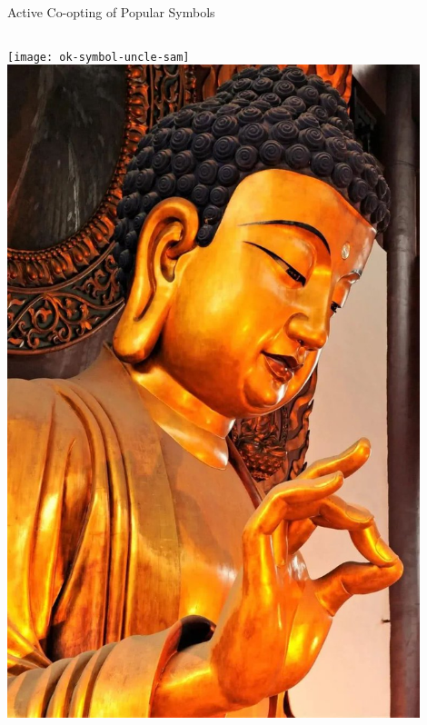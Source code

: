 \documentclass[nobackground,dvipsnames,table]{beamer}
\begin{document}
\begin{frame}{Active Co-opting of Popular Symbols}
    \begin{columns}
            \texttt{[image: ok-symbol-uncle-sam]}
            \includegraphics[width=0.9\textwidth]{ok-vitarka-mudra}
    \end{columns}
\end{frame}
\end{document}
